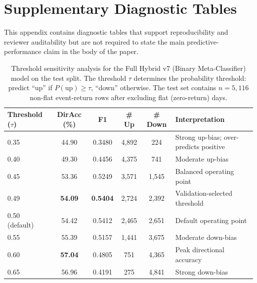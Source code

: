 \appendix
\section{Supplementary Diagnostic Tables}
\label{app:supplementary_diagnostics}

This appendix contains diagnostic tables that support reproducibility and reviewer auditability but are not required to state the main predictive-performance claim in the body of the paper.

\begin{table}[htbp]
\centering
\setlength{\tabcolsep}{3pt}
\caption{Threshold sensitivity analysis for the Full Hybrid v7 (Binary Meta-Classifier) model on the test split. The threshold $\tau$ determines the probability threshold: predict ``up'' if $P(\text{up}) \geq \tau$, ``down'' otherwise. The test set contains $n=5{,}116$ non-flat event-return rows after excluding flat (zero-return) days.}
\label{tab:threshold}
\small
\begin{tabular}{l c c c c p{4.2cm}}
\toprule
Threshold ($\tau$) & DirAcc (\%) & F1 & \# Up & \# Down & Interpretation \\
\midrule
0.35 & 44.90 & 0.3480 & 4,892 & 224 & Strong up-bias; over-predicts positive \\
0.40 & 49.30 & 0.4456 & 4,375 & 741 & Moderate up-bias \\
0.45 & 53.36 & 0.5249 & 3,571 & 1,545 & Balanced operating point \\
0.49 & \textbf{54.09} & \textbf{0.5404} & 2,724 & 2,392 & Validation-selected threshold \\
0.50 (default) & 54.42 & 0.5412 & 2,465 & 2,651 & Default operating point \\
0.55 & 55.39 & 0.5157 & 1,441 & 3,675 & Moderate down-bias \\
0.60 & \textbf{57.04} & 0.4805 & 751 & 4,365 & Peak directional accuracy \\
0.65 & 56.96 & 0.4191 & 275 & 4,841 & Strong down-bias \\
\bottomrule
\end{tabular}
\end{table}

